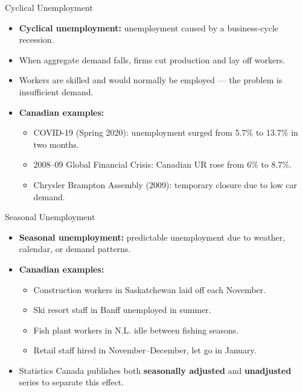 \documentclass[aspectratio=169]{beamer}
\begin{document}
\begin{frame}{Cyclical Unemployment}
\transfade
\begin{itemize}[<+->]
  \item \textbf{Cyclical unemployment:} unemployment caused by a \alert{business-cycle recession}.
  \item When aggregate demand falls, firms cut production and lay off workers.
  \item Workers are skilled and would normally be employed --- the problem is insufficient demand.
  \item \textbf{Canadian examples:}
  \begin{itemize}[<+->]
    \item COVID-19 (Spring 2020): unemployment surged from 5.7\% to 13.7\% in two months.
    \item 2008--09 Global Financial Crisis: Canadian UR rose from 6\% to 8.7\%.
    \item Chrysler Brampton Assembly (2009): temporary closure due to low car demand.
  \end{itemize}
\end{itemize}
\end{frame}

\begin{frame}{Seasonal Unemployment}
\transfade
\begin{itemize}[<+->]
  \item \textbf{Seasonal unemployment:} predictable unemployment due to weather, calendar, or demand patterns.
  \item \textbf{Canadian examples:}
  \begin{itemize}[<+->]
    \item Construction workers in Saskatchewan laid off each November.
    \item Ski resort staff in Banff unemployed in summer.
    \item Fish plant workers in N.L. idle between fishing seasons.
    \item Retail staff hired in November--December, let go in January.
  \end{itemize}
  \item Statistics Canada publishes both \textbf{seasonally adjusted} and \textbf{unadjusted} series to separate this effect.
\end{itemize}
\end{frame}
\end{document}
